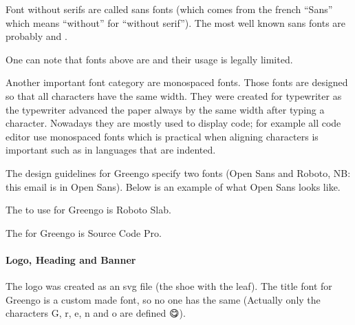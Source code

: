 \documentclass[letterpaper,10pt,english]{sphinxmanual}
\begin{document}
Font without serifs are called sans fonts (which comes from the french “Sans” which means “without” for “without serif”).
The most well known sans fonts are probably  and .

One can note that  fonts above are  and their usage is legally limited.

Another important font category are monospaced fonts.
Those fonts are designed so that all characters have the same width.
They were created for typewriter as the typewriter advanced the paper always by the same width after typing a character.
Nowadays they are mostly used to display code; for example all code editor use monospaced fonts which is practical when aligning characters is important such as in languages that are indented.

The design guidelines for Greengo specify two  fonts (Open Sans and Roboto, NB: this email is in Open Sans).
Below is an example of what Open Sans looks like.

\begin{figure}[htbp]
\centering

\noindent{}
\end{figure}

The  to use for Greengo is Roboto Slab.

\begin{figure}[htbp]
\centering

\noindent{}
\end{figure}

The  for Greengo is Source Code Pro.

\begin{figure}[htbp]
\centering

\noindent{}
\end{figure}


\paragraph{Logo, Heading and Banner}
\label{\detokenize{blog/2020/01/branding:logo-heading-and-banner}}
The logo was created as an svg file (the shoe with the leaf).
The title font for Greengo is a custom made font, so no one has the same (Actually only the characters G, r, e, n and o are defined 😋).
\end{document}
